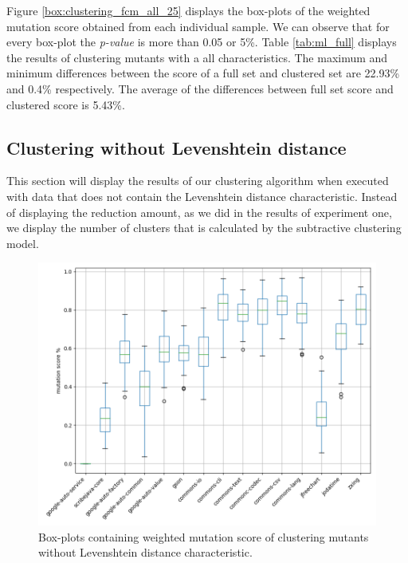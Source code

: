 \documentclass[../../main]{subfiles}
\begin{document}
\FloatBarrier
Figure \ref{box:clustering_fcm_all_25} displays the box-plots of the weighted mutation score obtained from each individual sample. 
We can observe that for every box-plot the \textit{p-value} is more than 0.05 or 5\%.
Table \ref{tab:ml_full} displays the results of clustering mutants with a all characteristics.
The maximum and minimum differences between the score of a full set and clustered set are 22.93\% and 0.4\% respectively.
The average of the differences between full set score and clustered score is 5.43\%.


\subsection{Clustering without Levenshtein distance}
This section will display the results of our clustering algorithm when executed with data that does not contain the Levenshtein distance characteristic. 
Instead of displaying the reduction amount, as we did in the results of experiment one, we display the number of clusters that is calculated by the subtractive clustering model.

\begin{figure}[H]
\includegraphics[width=\textwidth]{images/fcm_summary/fcm_no_distance.png}
\caption{\label{box:clustering_fcm_no_distance_25}Box-plots containing weighted mutation score of clustering mutants without Levenshtein distance characteristic.}
\end{figure}
\end{document}
